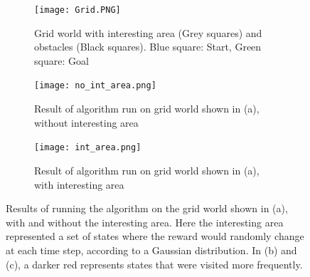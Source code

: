 \documentclass{acm_proc_article-sp}
\begin{document}
\begin{figure}[!htbp]
  \begin{subfigure}[h]{.3\textwidth}
  	\centering
    \texttt{[image: Grid.PNG]}
    \caption{Grid world with interesting area (Grey squares) and obstacles (Black squares). Blue square: Start, Green square: Goal}
  \end{subfigure}\hfill
  \begin{subfigure}[h]{.3\textwidth}
  \centering
    \texttt{[image: no\_int\_area.png]}
    \caption{Result of algorithm run on grid world shown in (a), without interesting area}
  \end{subfigure}
  \hfill
  \begin{subfigure}[h]{.3\textwidth}
  \centering
    \texttt{[image: int\_area.png]}
    \caption{Result of algorithm run on grid world shown in (a), with interesting area}
  \end{subfigure}
  \caption{Results of running the algorithm on the grid world shown in (a), with and without the interesting area. Here the interesting area represented a set of states where the reward would randomly change at each time step, according to a Gaussian distribution. In (b) and (c), a darker red represents states that were visited more frequently.}
  \vspace{20pt}
\end{figure}
\end{document}
